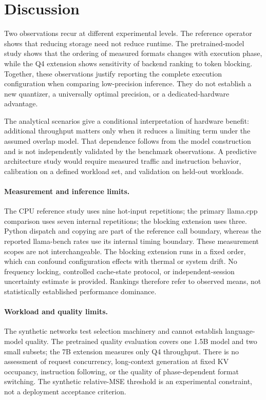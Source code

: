 \documentclass[11pt]{article}
\begin{document}
\section{Discussion}
Two observations recur at different experimental levels. The reference operator
shows that reducing storage need not reduce runtime. The pretrained-model study
shows that the ordering of measured formats changes with execution phase, while
the Q4 extension shows sensitivity of backend ranking to token blocking. Together,
these observations justify reporting the complete execution configuration when
comparing low-precision inference. They do not establish a new quantizer, a
universally optimal precision, or a dedicated-hardware advantage.

The analytical scenarios give a conditional interpretation of hardware benefit:
additional throughput matters only when it reduces a limiting term under the
assumed overlap model. That dependence follows from the model construction and
is not independently validated by the benchmark observations. A predictive
architecture study would require measured traffic and instruction behavior,
calibration on a defined workload set, and validation on held-out workloads.

\paragraph{Measurement and inference limits.}
The CPU reference study uses nine hot-input repetitions; the primary llama.cpp
comparison uses seven internal repetitions; the blocking extension uses three.
Python dispatch and copying are part of the reference call boundary, whereas the
reported llama-bench rates use its internal timing boundary. These measurement
scopes are not interchangeable. The blocking extension runs in a fixed order,
which can confound configuration effects with thermal or system drift. No
frequency locking, controlled cache-state protocol, or independent-session
uncertainty estimate is provided. Rankings therefore refer to observed means,
not statistically established performance dominance.

\paragraph{Workload and quality limits.}
The synthetic networks test selection machinery and cannot establish language-model
quality. The pretrained quality evaluation covers one 1.5B model and two small
subsets; the 7B extension measures only Q4 throughput. There is no assessment of
request concurrency, long-context generation at fixed KV occupancy, instruction
following, or the quality of phase-dependent format switching. The synthetic
relative-MSE threshold is an experimental constraint, not a deployment acceptance
criterion.
\end{document}
